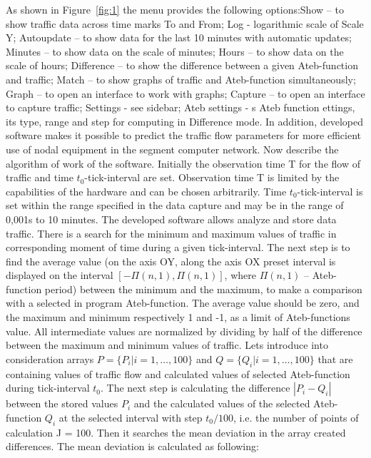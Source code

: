 \documentclass[runningheads,a4paper]{llncs}
\begin{document}
As shown in Figure~\ref{fig:1} the menu provides the following options:Show – to show traffic data across time marks To and From; Log - logarithmic scale of Scale Y; Autoupdate – to show data for the last 10 minutes with automatic updates; Minutes – to show data on the scale of minutes; Hours – to show data on the scale of hours; Difference – to show the difference between a given Ateb-function and traffic; Match – to show graphs of traffic and Ateb-function simultaneously; Graph – to open an interface to work with graphs; Capture – to open an interface to capture traffic; Settings - see sidebar; Ateb settings - s Ateb function ettings, its type, range and step for computing in Difference mode.
In addition, developed software makes it possible to predict the traffic flow parameters for more efficient use of nodal equipment in the segment computer network.
Now describe the algorithm of work of the software. Initially the observation time T for the flow of traffic and time $t_0$-tick-interval are set. Observation time T is limited by the capabilities of the hardware and can be chosen arbitrarily. Time $t_0$-tick-interval is set within the range specified in the data capture and may be in the range of 0,001s to 10 minutes. The developed software allows analyze and store data traffic. There is a search for the minimum and maximum values of traffic in corresponding moment of time during a given tick-interval. The next step is to find the average value (on the axis OY, along the axis OX preset interval is displayed on the interval $[-\Pi (n, 1), \Pi (n, 1)]$, where $\Pi (n, 1)$ – Ateb-function period) between the minimum and the maximum, to make a comparison with a selected in program Ateb-function. The average value should be zero, and the maximum and minimum respectively 1 and -1, as a limit of Ateb-functions value. All intermediate values are normalized by dividing by half of the difference between the maximum and minimum values of traffic.
Lets introduce into consideration arrays $P = \{P_i | i = 1, \ldots, 100\}$ and $Q = \{Q_i | i = 1, \ldots, 100\}$ that are containing values of traffic flow and calculated values of selected Ateb-function during tick-interval $t_0$. The next step is calculating the difference $| P_i-Q_i |$ between the stored values $P_i$ and the calculated values of the selected Ateb-function $Q_i$ at the selected interval with step $t_0 / 100$, i.e. the number of points of calculation J = 100. Then it searches the mean deviation in the array created differences. The mean deviation is calculated as following:
\end{document}
